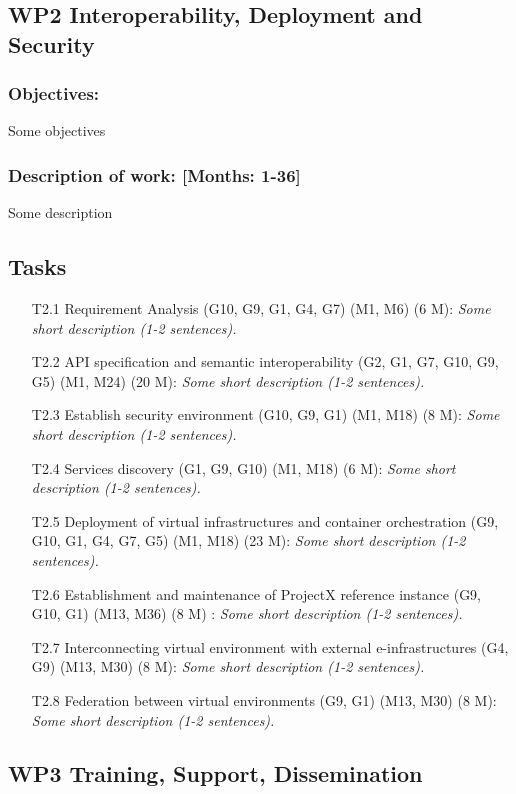 \documentclass{report}
\begin{document}
\subsection*{WP2 Interoperability, Deployment and Security}

\subsubsection{Objectives:} Some objectives
\subsubsection{Description of work: [Months: 1-36]} Some description


\subsection*{Tasks}

\begin{enumerate}
\item [T2.1] Requirement Analysis (G10, G9, G1, G4, G7) (M1, M6) (6 M): \emph{ Some short description (1-2 sentences).}
\item [T2.2] API specification and semantic interoperability (G2, G1, G7, G10, G9, G5) (M1, M24) (20 M): \emph{ Some short description (1-2 sentences).}
\item [T2.3] Establish security environment (G10, G9, G1) (M1, M18) (8 M): \emph{ Some short description (1-2 sentences).}
\item [T2.4] Services discovery (G1, G9, G10) (M1, M18) (6 M): \emph{ Some short description (1-2 sentences).}
\item [T2.5] Deployment of virtual infrastructures and container orchestration (G9, G10, G1, G4, G7, G5) (M1, M18) (23 M): \emph{ Some short description (1-2 sentences).}
\item [T2.6] Establishment and maintenance of ProjectX reference instance (G9, G10, G1) (M13, M36) (8 M) : \emph{ Some short description (1-2 sentences).}
\item [T2.7] Interconnecting virtual environment with external e-infrastructures (G4, G9) (M13, M30) (8 M): \emph{ Some short description (1-2 sentences).}
\item [T2.8] Federation between virtual environments (G9, G1) (M13, M30) (8 M): \emph{ Some short description (1-2 sentences).}
\end{enumerate}

\subsection*{WP3 Training, Support, Dissemination}
\end{document}
